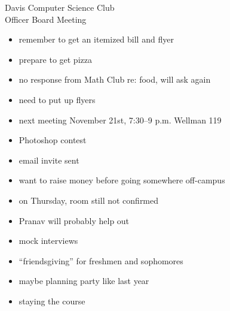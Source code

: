 \documentclass{article}
\begin{document}
\begin{Minutes}{Davis Computer Science Club\\Officer Board Meeting}




\maketitle
{}

\begin{itemize}
\item remember to get an itemized bill and flyer
\item prepare to get pizza
\item no response from Math Club re: food, will ask again
\item need to put up flyers
\end{itemize}

\begin{itemize}
\item next meeting November 21st, 7:30--9 p.m. Wellman 119
\item Photoshop contest
\item email invite sent
\item want to raise money before going somewhere off-campus
\end{itemize}

\begin{itemize}
\item on Thursday, room still not confirmed
\item Pranav will probably help out
\end{itemize}

\begin{itemize}
\item mock interviews
\item ``friendsgiving'' for freshmen and sophomores
\end{itemize}

\begin{itemize}
\item maybe planning party like last year
\item staying the course
\end{itemize}


\end{Minutes}
\end{document}
